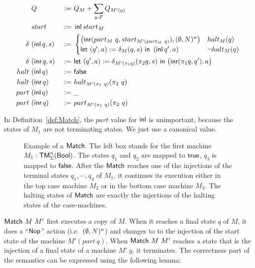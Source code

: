 \begin{definition}[$\MS{Match}~M~M'$]
  \label{def:Match}
  \begin{alignat*}{3}
    & Q                  &~:=~& Q_M +  \sum_{y:F} Q_{M'(y)} \\
    & start              &~:=~& \operatorname{\textsf{inl}} start_M \\
    \delta ~&(\operatorname{\textsf{inl}} q, s) &~:=~&
    \begin{cases}
      \bigl(\operatorname{\textsf{inr}} (part_M~q, start_{M' (part_M~q)}), (\emptyset, N)^n \bigr) & halt_M(q) \\
      \textsf{let}~(q', a) := \delta_M(q, s)~\textsf{in}~\left(\operatorname{\textsf{inl}} q', a \right) & \lnot halt_M(q)
    \end{cases} \\
    \delta ~&(\operatorname{\textsf{inr}} q, s) &~:=~& \textsf{let}~(q', a) := \delta_{M'(\pi_1 q)} (\pi_2 q, s)~\textsf{in}~\bigl( \operatorname{\textsf{inr}} (\pi_1 q, q'), a \bigr) \\
    halt   ~&(\operatorname{\textsf{inl}}  q)   &~:=~& \textsf{false} \\
    halt   ~&(\operatorname{\textsf{inr}}  q)   &~:=~& halt_{M'(\pi_1~q)} (\pi_2~q) \\
    part   ~&(\operatorname{\textsf{inl}}  q)   &~:=~& \_ \\
    part   ~&(\operatorname{\textsf{inr}}  q)   &~:=~& part_{M'(\pi_1~q)} (\pi_2~q)
  \end{alignat*}
\end{definition}

In Definition~\ref{def:Match}, the $part$ value for $\operatorname{\textsf{inl}}$ is unimportant, because the states of $M_1$ are not terminating states.  We just use a
canonical value.

\begin{figure}
  \center
  
  \caption{Example of a $\textsf{Match}$.  The left box stands for the first machine $M_1:\textsf{TM}_\Sigma^n(\textsf{Bool})$.  The states $q_1$ and $q_2$ are mapped to
    $\textsf{true}$, $q_3$ is mapped to $\textsf{false}$.  After the $\textsf{Match}$ reaches one of the injections of the terminal states $q_1, \cdots, q_3$ of $M_1$, it
    continues its execution either in the top case machine $M_2$ or in the bottom case machine $M_3$.  The halting states of $\textsf{Match}$ are exactly
    the injections of the halting states of the case-machines.}
  \label{fig:match}
\end{figure}


$\MS{Match}~M~M'$ first executes a copy of $M$.  When it reaches a final state $q$ of $M$, it does a ``$\textsf{Nop}$'' action (i.e.\ $(\emptyset,N)^n$) and
changes to to the injection of the start state of the machine $M'(part~q)$.  When $\MS{Match}~M~M'$ reaches a state that is the injection of a final
state of a machine $M'~y$, it terminates.  The correctness part of the semantics can be expressed using the following lemma:

